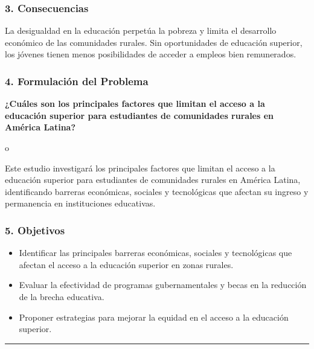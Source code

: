 \documentclass[
  letterpaper,
  DIV=11,
  numbers=noendperiod]{scrartcl}
\providecommand{\tightlist}{%
  \setlength{\itemsep}{0pt}\setlength{\parskip}{0pt}}
\begin{document}
\subsubsection{\texorpdfstring{\textbf{3.
Consecuencias}}{3. Consecuencias}}\label{consecuencias-1}

La desigualdad en la educación perpetúa la pobreza y limita el
desarrollo económico de las comunidades rurales. Sin oportunidades de
educación superior, los jóvenes tienen menos posibilidades de acceder a
empleos bien remunerados.

\subsubsection{\texorpdfstring{\textbf{4. Formulación del
Problema}}{4. Formulación del Problema}}\label{formulaciuxf3n-del-problema-1}

\textbf{¿Cuáles son los principales factores que limitan el acceso a la
educación superior para estudiantes de comunidades rurales en América
Latina?}

o

Este estudio investigará los principales factores que limitan el acceso
a la educación superior para estudiantes de comunidades rurales en
América Latina, identificando barreras económicas, sociales y
tecnológicas que afectan su ingreso y permanencia en instituciones
educativas.

\subsubsection{\texorpdfstring{\textbf{5.
Objetivos}}{5. Objetivos}}\label{objetivos-1}

\begin{itemize}
\tightlist
\item
  Identificar las principales barreras económicas, sociales y
  tecnológicas que afectan el acceso a la educación superior en zonas
  rurales.\\
\item
  Evaluar la efectividad de programas gubernamentales y becas en la
  reducción de la brecha educativa.\\
\item
  Proponer estrategias para mejorar la equidad en el acceso a la
  educación superior.
\end{itemize}

\begin{center}\rule{0.5\linewidth}{0.5pt}\end{center}
\end{document}
